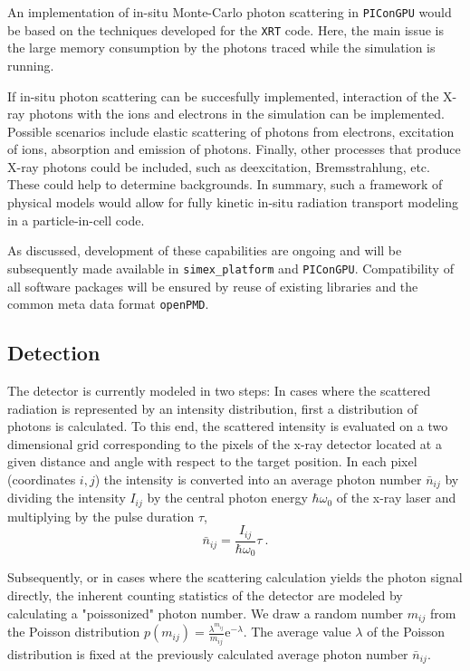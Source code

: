 \documentclass[a4paper]{article}
\begin{document}
An implementation of in-situ Monte-Carlo photon scattering in \texttt{PIConGPU} would be based on the techniques developed for the \texttt{XRT} code. Here, the main issue is the large memory consumption by the photons traced while the simulation is running.

If in-situ photon scattering can be succesfully implemented, interaction of the X-ray photons with the ions and electrons in the simulation can be implemented. Possible scenarios include elastic scattering of photons from electrons, excitation of ions, absorption and emission of photons. Finally, other processes that produce X-ray photons could be included, such as deexcitation, Bremsstrahlung, etc. These could help to determine backgrounds. In summary, such a framework of physical models would allow for fully kinetic in-situ radiation transport modeling in a particle-in-cell code.

As discussed, development of these capabilities are ongoing and will be subsequently made available in \texttt{simex\_platform} and \texttt{PIConGPU}. Compatibility of all software packages will be ensured by reuse of existing libraries and the common meta data format \texttt{openPMD}.

\subsection{Detection}
The detector is currently modeled in two steps: In cases where the scattered radiation is represented by an intensity
distribution, first a distribution of photons is calculated. To this end,
the scattered intensity is evaluated on a two dimensional grid corresponding to the pixels of the x-ray
detector located at a given distance and angle with respect to the target position.
In each pixel (coordinates $i,j$) the intensity is converted into an average photon number $\bar n_{ij}$ by dividing the intensity
$I_{ij}$ by the central photon energy $\hbar\omega_{0}$ of the x-ray laser and multiplying by the pulse duration $\tau$,
\begin{equation}
  \bar n_{ij} = \frac{I_{ij}}{\hbar\omega_0} \tau~.
  \label{eqn:number_of_photons_from_intensity}
\end{equation}

Subsequently, or in cases where the scattering calculation yields the photon signal directly,
the inherent counting statistics of the detector are modeled by
calculating a "poissonized" photon number. We draw a random number $m_{ij}$
from the Poisson distribution $p(m_{ij}) = \frac{\lambda^{m_{ij}}}{m_{ij}\!}\mathrm{e}^{-\lambda}$. The average value $\lambda$
of the Poisson distribution is fixed at the previously calculated average photon number $\bar n_{ij}$.
\end{document}
